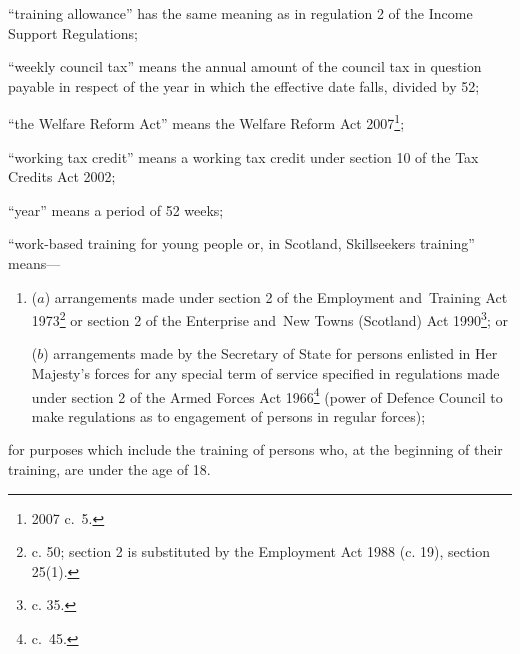 \documentclass[12pt,a4paper]{article}
\begin{document}
\begin{enumerate}
“training allowance” has the same meaning as in regulation 2 of the Income Support Regulations;


“weekly council tax” means the annual amount of the council tax in question payable in respect of the year in which the effective date falls, divided by 52;

“the Welfare Reform Act” means the Welfare Reform Act 2007\footnote{2007 c.~5.};


“working tax credit” means a working tax credit under section 10 of the Tax Credits Act 2002;

“year” means a period of 52 weeks;

“work-based training for young people or, in Scotland, Skillseekers training”  %
means—
\begin{enumerate}\item[]
($a$)
arrangements made under section 2 of the Employment and~Training Act 1973\footnote{ c. 50; section 2 is substituted by the Employment Act 1988 (c. 19), section 25(1).} or section 2 of the Enterprise and~New Towns (Scotland) Act 1990\footnote{ c. 35.}; or

($b$)
arrangements made by the Secretary of State for persons enlisted in Her Majesty’s forces for any special term of service specified in regulations made under section 2 of the Armed Forces Act 1966\footnote{ c.~45.} (power of Defence Council to make regulations as to engagement of persons in regular forces);
\end{enumerate}

for purposes which include the training of persons who, at the beginning of their training, are under the age of 18.
\end{enumerate}
\end{document}
